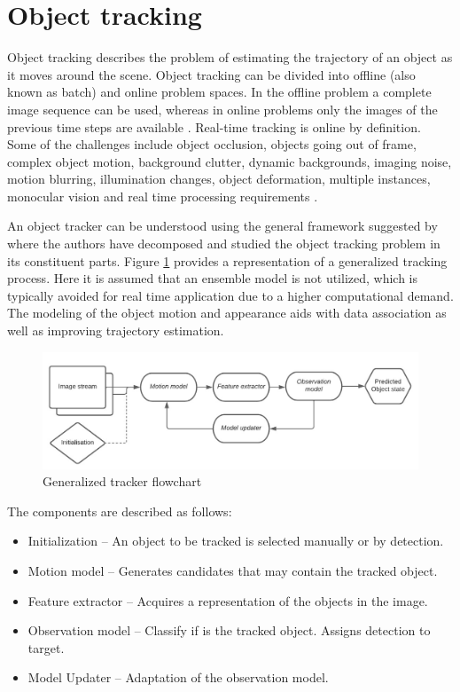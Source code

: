 \documentclass[a4paper,twoside,12pt]{report}
\begin{document}
\section{Object tracking}

Object tracking describes the problem of estimating the trajectory of an object as it moves around the scene. Object tracking can be divided into offline (also known as batch) and online problem spaces. In the offline problem a complete image sequence can be used, whereas in online problems only the images of the previous time steps are available  \citep{track0}. Real-time tracking is online by definition. Some of the challenges include object occlusion, objects going out of frame, complex object motion, background clutter, dynamic backgrounds, imaging noise, motion blurring, illumination changes, object deformation, multiple instances, monocular vision and real time processing requirements \citep{tradtrack0}.

An object tracker can be understood using the general framework suggested by \cite{diagnosingtrack} where the authors have decomposed and studied the object tracking problem in its constituent parts. Figure \ref{fig:tracker} provides a representation of a generalized tracking process. Here it is assumed that an ensemble model is not utilized, which is typically avoided for real time application due to a higher computational demand. The modeling of the object motion and appearance aids with data association as well as improving trajectory estimation. \citep{sort}  

\begin{figure}[h!]
\begin{center}
\includegraphics[width=13.5cm]{images/Tracking_flowchart.jpeg}
\caption{Generalized tracker flowchart}
\label{fig:tracker}
\end{center}
\end{figure}

\pagebreak
The components are described as follows:

\begin{itemize}
    \item Initialization -- An object to be tracked is selected manually or by detection.
    \item Motion model -- Generates candidates that may contain the tracked object.
    \item Feature extractor -- Acquires a representation of the objects in the image.
    \item Observation model -- Classify if is the tracked object. Assigns detection to target.
    \item Model Updater -- Adaptation of the observation model.
\end{itemize}
\end{document}
